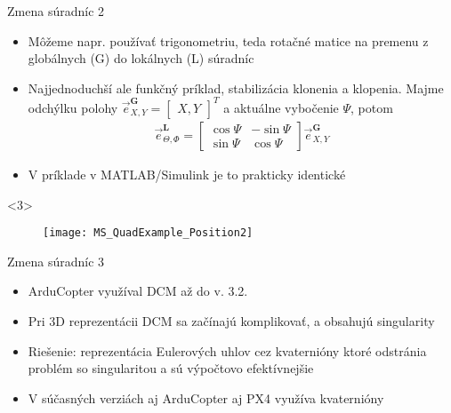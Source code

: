  \begin{frame}[t]{Zmena súradníc 2}
\begin{itemize}
  \item<1-> Môžeme napr. používať trigonometriu, teda rotačné matice  na premenu z globálnych (G) do lokálnych (L) súradníc
  \item<2-> Najjednoduchší ale funkčný príklad, stabilizácia klonenia a klopenia. Majme odchýlku polohy $\vec{e}^{\mathbf{G}}_{X,Y}=\begin{bmatrix}X,Y\end{bmatrix}^T$ a aktuálne vybočenie $\Psi$, potom \citep{BenAri2017}
      \begin{align}
      \vec{e}^{\mathbf{L}}_{\Theta,\Phi}=
      \begin{bmatrix}
          \cos{\Psi} & -\sin{\Psi} \\
          \sin{\Psi} & \cos{\Psi}
      \end{bmatrix}
      \vec{e}^{\mathbf{G}}_{X,Y}
      \end{align}
  \item<3-> V príklade v MATLAB/Simulink je to prakticky identické
\end{itemize}

  \begin{onlyenv}<3>
  \begin{figure}
\centering
  \texttt{[image: MS\_QuadExample\_Position2]}\\
\end{figure}
\end{onlyenv}

\end{frame}


 \begin{frame}[t]{Zmena súradníc 3}
\begin{itemize}
  \item<1-> ArduCopter využíval DCM až do v. 3.2.  
   \item<2-> Pri 3D reprezentácii DCM sa začínajú komplikovať, a obsahujú singularity \citep{BenAri2017}
   \item<3-> Riešenie: reprezentácia Eulerových uhlov cez kvaternióny  ktoré odstránia problém so singularitou a sú výpočtovo efektívnejšie \citep{BenAri2017}
       \item<4-> V súčasných verziách aj ArduCopter aj PX4 využíva kvaternióny
\end{itemize}
\end{frame}



